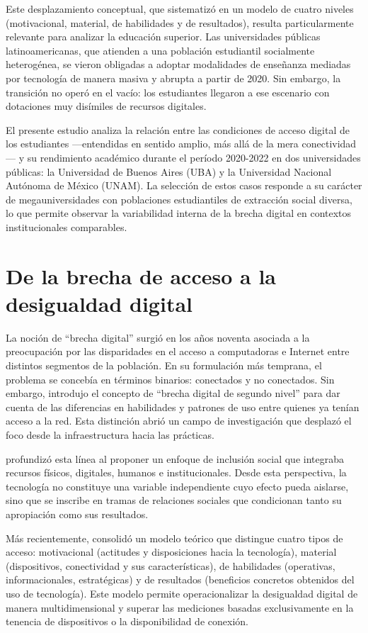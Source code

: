 \documentclass{article}
\begin{document}
Este desplazamiento conceptual, que \autocite{2563-VANDIJK2020} sistematizó en un modelo de cuatro niveles (motivacional, material, de habilidades y de resultados), resulta particularmente relevante para analizar la educación superior. Las universidades públicas latinoamericanas, que atienden a una población estudiantil socialmente heterogénea, se vieron obligadas a adoptar modalidades de enseñanza mediadas por tecnología de manera masiva y abrupta a partir de 2020. Sin embargo, la transición no operó en el vacío: los estudiantes llegaron a ese escenario con dotaciones muy disímiles de recursos digitales.

El presente estudio analiza la relación entre las condiciones de acceso digital de los estudiantes —entendidas en sentido amplio, más allá de la mera conectividad— y su rendimiento académico durante el período 2020-2022 en dos universidades públicas: la Universidad de Buenos Aires (UBA) y la Universidad Nacional Autónoma de México (UNAM). La selección de estos casos responde a su carácter de megauniversidades con poblaciones estudiantiles de extracción social diversa, lo que permite observar la variabilidad interna de la brecha digital en contextos institucionales comparables.


\section{De la brecha de acceso a la desigualdad digital}
La noción de “brecha digital” surgió en los años noventa asociada a la preocupación por las disparidades en el acceso a computadoras e Internet entre distintos segmentos de la población. En su formulación más temprana, el problema se concebía en términos binarios: conectados y no conectados. Sin embargo, \autocite{2565-HARGITTAI2002} introdujo el concepto de “brecha digital de segundo nivel” para dar cuenta de las diferencias en habilidades y patrones de uso entre quienes ya tenían acceso a la red. Esta distinción abrió un campo de investigación que desplazó el foco desde la infraestructura hacia las prácticas.

\autocite{2562-WARSCHAUER2004} profundizó esta línea al proponer un enfoque de inclusión social que integraba recursos físicos, digitales, humanos e institucionales. Desde esta perspectiva, la tecnología no constituye una variable independiente cuyo efecto pueda aislarse, sino que se inscribe en tramas de relaciones sociales que condicionan tanto su apropiación como sus resultados.

Más recientemente,\autocite{2563-VANDIJK2020} consolidó un modelo teórico que distingue cuatro tipos de acceso: motivacional (actitudes y disposiciones hacia la tecnología), material (dispositivos, conectividad y sus características), de habilidades (operativas, informacionales, estratégicas) y de resultados (beneficios concretos obtenidos del uso de tecnología). Este modelo permite operacionalizar la desigualdad digital de manera multidimensional y superar las mediciones basadas exclusivamente en la tenencia de dispositivos o la disponibilidad de conexión.
\end{document}
